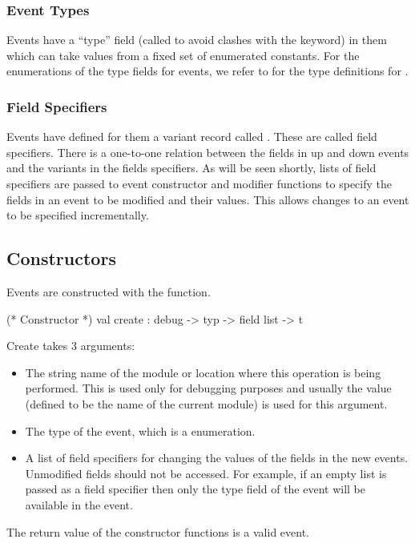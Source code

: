 \subsubsection{Event Types}
Events have a ``type'' field (called  to avoid clashes with the
 keyword) in them which can take values from a fixed set of
enumerated constants.  For the enumerations of the type fields for events, we
refer to  for the type definitions for .

\subsubsection{Field Specifiers}
Events have defined for them a variant record called .  These are
called field specifiers.  There is a one-to-one relation between the fields in
up and down events and the variants in the fields specifiers.  As will be seen
shortly, lists of field specifiers are passed to event constructor and modifier
functions to specify the fields in an event to be modified and their values.
This allows changes to an event to be specified incrementally.

\subsection{Constructors}
Events are constructed with the  function.

\begin{codebox}
  (* Constructor *)
val create	: debug -> typ -> field list -> t
\end{codebox}

Create takes 3 arguments:
\begin{itemize}
\item
The string name of the module or location where this operation is being
performed.  This is used only for debugging purposes and usually the value
 (defined to be the name of the current module) is used for
this argument.
\item
The type of the event, which is a  enumeration.
\item
A list of field specifiers for changing the values of the fields in the new
events.  Unmodified fields should not be accessed.  For example, if an empty
list is passed as a field specifier then only the type field of the event will
be available in the event.
\end{itemize}
The return value of the constructor functions is a valid event.

